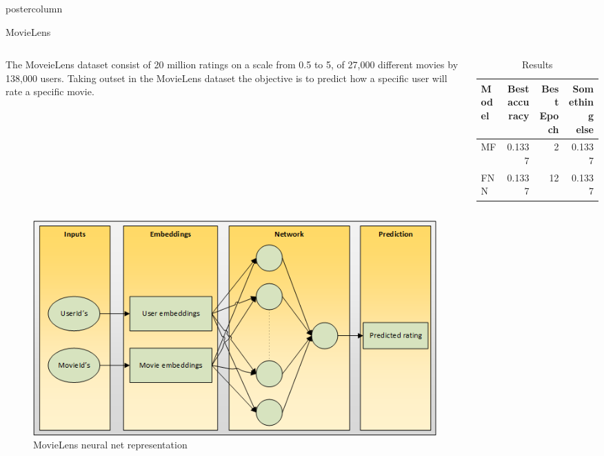 \documentclass[final,hyperref={pdfpagelabels=false}]{beamer}
\begin{document}
\begin{frame}
\begin{columns}
\begin{column}{.49\paperwidth}
\begin{beamercolorbox}[center,wd=\textwidth]{postercolumn}
\begin{minipage}[T]{.99\textwidth}
{\begin{block}{MovieLens}
\begin{columns}
\begin{column}{1\textwidth}
\begin{minipage}[t]{0.96\textwidth}
\hspace{0.5cm} 
\vspace{-1cm}
\begin{columns}
 \begin{column}{0.45\textwidth}
 \justifying
 \footnotesize{
	The MoveieLens dataset consist of 20 million ratings on a scale from 0.5 to 5, of 27,000 different movies by 138,000 users. Taking outset in the MovieLens dataset the objective is to predict how a specific user will rate a specific movie. }
 \end{column}
 \begin{column}{0.49\textwidth}

\begin{table}[h]
\small
\centering
\caption{Results} 
\label{res:MovieLens_results}
\begin{tabular}{lrrr}
\toprule
Model  & Best accuracy        & Best Epoch     & Something else    \\
\midrule
MF  	&  0.1337        & 2       & 0.1337    \\
FNN	  &  0.1337        & 12      & 0.1337    \\
\bottomrule
\end{tabular}
\end{table}

 \end{column}
 \end{columns}
 
 \begin{figure}

\includegraphics[width=0.75\textwidth]{movielensnet.png}
 \caption{MovieLens neural net representation}
\end{figure}  

 \begin{figure}


\end{figure}
\end{minipage}
\end{column}
\end{columns}
\end{block}}
\end{minipage}
\end{beamercolorbox}
\end{column}
\end{columns}
\end{frame}
\end{document}
